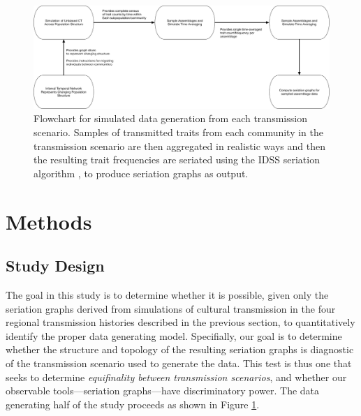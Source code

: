     \begin{figure}[ht]
    \centering
    \includegraphics[scale=0.25]{graphics/multipleseriation/simulation-sampling-seriation-flowchart.pdf}
    \caption{Flowchart for simulated data generation from each transmission scenario.  Samples of transmitted traits from each community in the transmission scenario are then aggregated in realistic ways and then the resulting trait frequencies are seriated using the IDSS seriation algorithm \citep{Lipo2015}, to produce seriation graphs as output.}
    \label{metapop:fig:simulation-flowchart}
    \end{figure}
    
    \section{Methods}\label{metapop:sec:methods}
    
    \subsection{Study Design}\label{metapop:sec:study-design}
    
    The goal in this study is to determine whether it is possible, given only the seriation graphs derived from simulations of cultural transmission in the four regional transmission histories described in the previous section, to quantitatively identify the proper data generating model. Specifially, our goal is to determine whether the structure and topology of the resulting seriation graphs is diagnostic of the transmission scenario used to generate the data.  This test is thus one that seeks to determine \emph{equifinality between transmission scenarios}, and whether our observable tools---seriation graphs---have discriminatory power.  The data generating half of the study proceeds as shown in Figure \ref{metapop:fig:simulation-flowchart}.    
    
